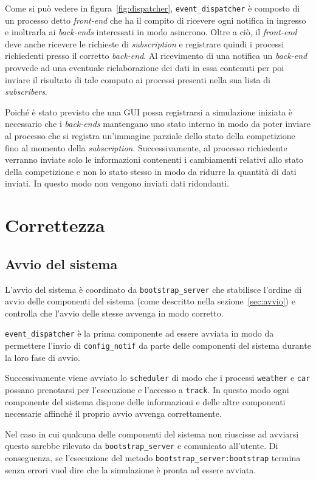 \documentclass[11pt,a4paper]{report}
\newcommand{\fun}[1]{\texttt{#1}}
\begin{document}
Come si può vedere in figura~\ref{fig:dispatcher}, \texttt{event\_dispatcher} è composto di un processo detto \textit{front-end} che ha il compito di ricevere ogni notifica in ingresso e inoltrarla ai \textit{back-ends} interessati in modo asincrono. Oltre a ciò, il \textit{front-end} deve anche ricevere le richieste di \textit{subscription} e registrare quindi i processi richiedenti presso il corretto \textit{back-end}. Al ricevimento di una notifica un \textit{back-end} provvede ad una eventuale rielaborazione dei dati in essa contenuti per poi inviare il risultato di tale computo ai processi presenti nella sua lista di \textit{subscribers}.

Poiché è stato previsto che una GUI possa registrarsi a simulazione iniziata è necessario che i \textit{back-ends} mantengano uno stato interno in modo da poter inviare al processo che si registra un'immagine parziale dello stato della competizione fino al momento della \textit{subscription}. Successivamente, al processo richiedente verranno inviate solo le informazioni contenenti i cambiamenti relativi allo stato della competizione e non lo stato stesso in modo da ridurre la quantità di dati inviati. In questo modo non vengono inviati dati ridondanti.


\chapter{Correttezza}
\section{Avvio del sistema}
L'avvio del sistema è coordinato da \texttt{bootstrap\_server} che stabilisce l'ordine di avvio delle componenti del sistema (come descritto nella sezione~\ref{sec:avvio}) e controlla che l'avvio delle stesse avvenga in modo corretto.

\texttt{event\_dispatcher} è la prima componente ad essere avviata in modo da permettere l'invio di \fun{config\_notif} da parte delle componenti del sistema durante la loro fase di avvio.

Successivamente viene avviato lo \texttt{scheduler} di modo che i processi \texttt{weather} e \texttt{car} possano prenotarsi per l'esecuzione e l'accesso a \texttt{track}. In questo modo ogni componente del sistema dispone delle informazioni e delle altre componenti necessarie affinché il proprio avvio avvenga correttamente.

Nel caso in cui qualcuna delle componenti del sistema non riuscisse ad avviarsi questo sarebbe rilevato da \texttt{bootstrap\_server} e comunicato all'utente. Di conseguenza, se l'esecuzione del metodo \fun{bootstrap\_server:bootstrap} termina senza errori vuol dire che la simulazione è pronta ad essere avviata.
\end{document}
